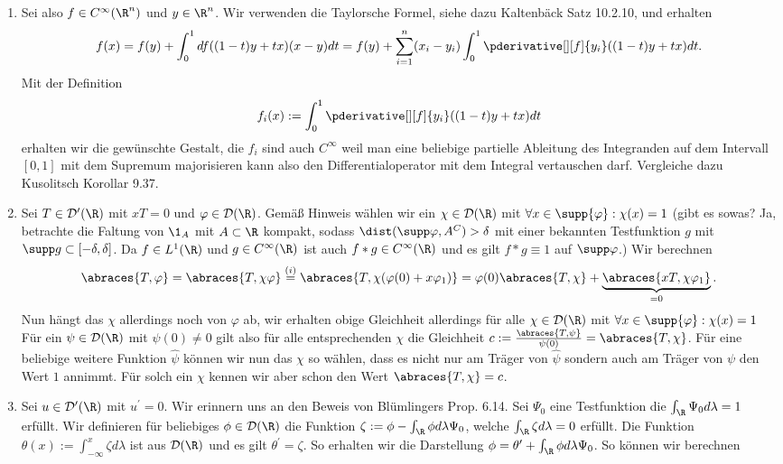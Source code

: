 \begin{solution}
\phantom{}
\begin{enumerate}[label = (\roman*)]
	\item Sei also $f \in C^\infty(\R^n)$ und $y \in \R^n$. Wir verwenden die Taylorsche Formel, siehe dazu Kaltenbäck Satz 10.2.10, und erhalten
	\begin{align*}
	f(x) = f(y) + \int_0^1 df((1-t)y + tx)(x - y) dt = f(y) + \sum_{i = 1}^n (x_i - y_i) \int_0^1 \pderivative[][f]{y_i} ((1-t)y + tx) dt.
	\end{align*}
	Mit der Definition
	\begin{align*}
	f_i(x) := \int_0^1  \pderivative[][f]{y_i} ((1-t)y + tx) dt
	\end{align*}
	erhalten wir die gewünschte Gestalt, die $f_i$ sind auch $C^\infty$ weil man eine beliebige partielle Ableitung des Integranden auf dem Intervall $[0,1]$ mit dem Supremum majorisieren kann also den Differentialoperator mit dem Integral vertauschen darf. Vergleiche dazu Kusolitsch Korollar 9.37.
	\item Sei $T \in \mathcal{D}^\prime(\R)$ mit $xT = 0$ und $\varphi \in \mathcal{D}(\R)$. Gemäß Hinweis wählen wir ein $\chi \in \mathcal{D}(\R)$ mit $\forall x \in \supp{\varphi}: \chi(x) = 1$ (gibt es sowas?
  Ja, betrachte die Faltung von $\1_A$ mit $A \subset \R$ kompakt, sodass $\dist(\supp \varphi, A^C) > \delta$ mit einer bekannten Testfunktion $g$ mit $\supp g \subset [-\delta, \delta]$.
  Da $f \in L^1(\R)$ und $g \in C^{\infty}(\R)$ ist auch $f*g \in C^{\infty}(\R)$ und es gilt $f*g \equiv 1$ auf $\supp \varphi$.) Wir berechnen
	\begin{align*}
	\abraces{T,\varphi} = \abraces{T, \chi \varphi} \stackrel{(i)}{=} \abraces{T, \chi (\varphi(0) + x\varphi_1)} = \varphi(0) \abraces{T, \chi} + \underbrace{\abraces{xT, \chi \varphi_1}}_{=0}.
	\end{align*}
	Nun hängt das $\chi$ allerdings noch von $\varphi$ ab, wir erhalten obige Gleichheit allerdings für alle $\chi \in \mathcal{D}(\R)$ mit $\forall x \in \supp{\varphi}: \chi(x) = 1$ Für ein $\psi \in \mathcal{D}(\R)$ mit $\psi(0) \neq 0$ gilt also für alle entsprechenden $\chi$ die Gleichheit $c := \frac{\abraces{T,\psi}}{\psi(0)} = \abraces{T, \chi}$. Für eine beliebige weitere Funktion $\hat{\psi}$ können wir nun das $\chi$ so wählen, dass es nicht nur am Träger von $\hat{\psi}$ sondern auch am Träger von $\psi$ den Wert $1$ annimmt. Für solch ein $\chi$ kennen wir aber schon den Wert $\abraces{T, \chi} = c$. 
	\item Sei $u \in \mathcal{D}^\prime(\R)$ mit $u^\prime = 0$. Wir erinnern uns an den Beweis von Blümlingers Prop. 6.14. Sei $\Psi_0$ eine Testfunktion die $\int_\R \Psi_0 d\lambda = 1$ erfüllt. Wir definieren für beliebiges $\phi \in \mathcal{D}(\R)$ die Funktion $\zeta := \phi - \int_\R \phi d\lambda \Psi_0$, welche $\int_\R \zeta d\lambda = 0$ erfüllt. Die Funktion $\theta(x) := \int_{-\infty}^{x} \zeta d\lambda$ ist aus $\mathcal{D}(\R)$ und es gilt $\theta^\prime = \zeta$. So erhalten wir die Darstellung $\phi = \theta^\prime + \int_\R \phi d\lambda \Psi_0$. So können wir berechnen

\end{enumerate}
\end{solution}
